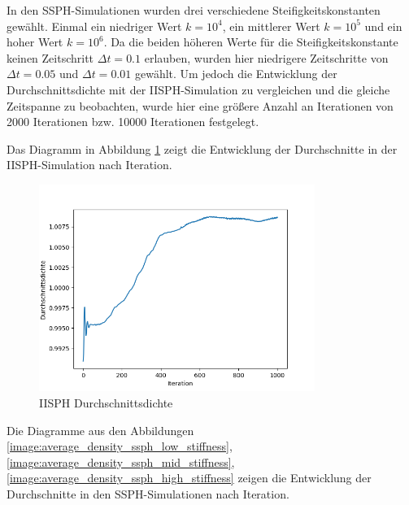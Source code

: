 \documentclass[11pt,
a4paper,
parskip=half, %
BCOR=10mm, %
english,
ngerman]{scrreprt}
\begin{document}
In den SSPH-Simulationen wurden drei verschiedene Steifigkeitskonstanten gewählt.
Einmal ein niedriger Wert $k = 10^4$, ein mittlerer Wert $k = 10^5$ und ein hoher Wert $k = 10^6$.
Da die beiden höheren Werte für die Steifigkeitskonstante keinen Zeitschritt $\Delta t = 0.1$ erlauben, wurden hier niedrigere Zeitschritte von $\Delta t = 0.05$
und $\Delta t = 0.01$ gewählt.
Um jedoch die Entwicklung der Durchschnittsdichte mit der IISPH-Simulation zu vergleichen und die gleiche Zeitspanne zu beobachten,
wurde hier eine größere Anzahl an Iterationen von 2000 Iterationen bzw. 10000 Iterationen festgelegt.

Das Diagramm in Abbildung \ref{image:average_density_iisph} zeigt die Entwicklung der Durchschnitte in der IISPH-Simulation nach Iteration.

\begin{figure}[htb]
    \includegraphics[width=0.8\textwidth]{average_density_iisph.png}
    \caption{IISPH Durchschnittsdichte}
    \label{image:average_density_iisph}
\end{figure}

Die Diagramme aus den Abbildungen \ref{image:average_density_ssph_low_stiffness}, \ref{image:average_density_ssph_mid_stiffness}, \ref{image:average_density_ssph_high_stiffness}
zeigen die Entwicklung der Durchschnitte in den SSPH-Simulationen nach Iteration.
\end{document}
